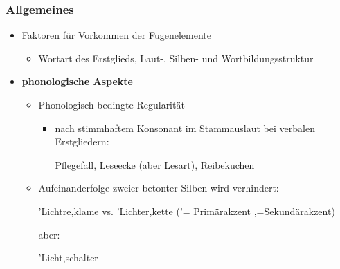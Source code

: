 \begin{frame}
\frametitle{Allgemeines}

\begin{itemize}
	\item Faktoren für Vorkommen der Fugenelemente
	
	\begin{itemize}
		\item Wortart des Erstglieds, Laut-, Silben- und Wortbildungsstruktur
	\end{itemize}
	\item \textbf{phonologische Aspekte}
	
	\begin{itemize}
		\item Phonologisch bedingte Regularität
		
		\begin{itemize}
			\item {} nach stimmhaftem Konsonant im Stammauslaut bei verbalen Erstgliedern:
			
			\ea Pflegefall, Leseecke (aber Lesart), Reibekuchen
			\z
			
		\end{itemize}
		
		\item Aufeinanderfolge zweier betonter Silben wird verhindert:
		
		\ea 'Lichtre,klame vs. 'Lichter,kette ('= Primärakzent ,=Sekundärakzent)
		\z
		
		aber:
		
		\ea 'Licht,schalter	
		\z
			
	\end{itemize}
\end{itemize}


\end{frame}


